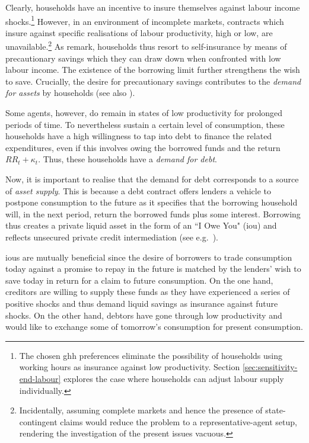\documentclass[a4paper,12pt]{article} %
\numberwithin{equation}{section} %
\numberwithin{figure}{section}
\numberwithin{table}{section}
\begin{document}
Clearly, households have an incentive to insure themselves against labour income shocks.\footnote{The chosen \Gls{ghh} preferences eliminate the possibility of households using working hours as insurance against low productivity. Section \ref{sec:sensitivity-end-labour} explores the case where households can adjust labour supply individually.} However, in an environment of incomplete markets, contracts which insure against specific realisations of labour productivity, high or low, are unavailable.\footnote{Incidentally, assuming complete markets and hence the presence of state-contingent claims would reduce the problem to a representative-agent setup, rendering the investigation of the present issues vacuous.} As \textcite{heath2009} remark, households thus resort to self-insurance by means of precautionary savings which they can draw down when confronted with low labour income. The existence of the borrowing limit further strengthens the wish to save. Crucially, the desire for precautionary savings contributes to the \textit{demand for assets} by households (see also \cite{brunnermeier2012}).

Some agents, however, do remain in states of low productivity for prolonged periods of time. To nevertheless sustain a certain level of consumption, these households have a high willingness to tap into debt to finance the related expenditures, even if this involves owing the borrowed funds and the return $RR_t + \kappa_t$. Thus, these households have a \textit{demand for debt}.

Now, it is important to realise that the demand for debt corresponds to a source of \textit{asset supply}. This is because a debt contract offers lenders a vehicle to postpone consumption to the future as it specifies that the borrowing household will, in the next period, return the borrowed funds plus some interest. Borrowing thus creates a private liquid asset in the form of an ``I Owe You" (\Gls{iou}) and reflects unsecured private credit intermediation (see e.g.~\cite{bayer2023}).

\Gls{iou}s are mutually beneficial since the desire of borrowers to trade consumption today against a promise to repay in the future is matched by the lenders' wish to save today in return for a claim to future consumption. On the one hand, creditors are willing to supply these funds as they have experienced a series of positive shocks and thus demand liquid savings as insurance against future shocks. On the other hand, debtors have gone through low productivity and would like to exchange some of tomorrow's consumption for present consumption.
\end{document}
